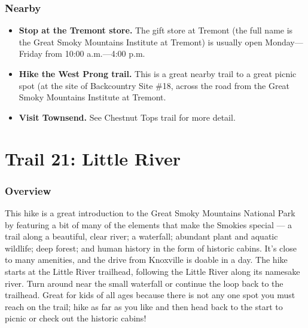 \documentclass[
  letterpaper,
  DIV=11,
  numbers=noendperiod]{scrreprt}
\providecommand{\tightlist}{%
  \setlength{\itemsep}{0pt}\setlength{\parskip}{0pt}}\usepackage{longtable,booktabs,array}
\begin{document}
\subsection{Nearby}\label{nearby-19}

\begin{itemize}
\tightlist
\item
  \textbf{Stop at the Tremont store.} The gift store at Tremont (the
  full name is the Great Smoky Mountains Institute at Tremont) is
  usually open Monday---Friday from 10:00 a.m.---4:00 p.m.
\item
  \textbf{Hike the West Prong trail.} This is a great nearby trail to a
  great picnic spot (at the site of Backcountry Site \#18, across the
  road from the Great Smoky Mountains Institute at Tremont.
\item
  \textbf{Visit Townsend.} See Chestnut Tops trail for more detail.
\end{itemize}

\chapter{Trail 21: Little River}\label{trail-21-little-river}

\subsection{Overview}\label{overview-21}

This hike is a great introduction to the Great Smoky Mountains National
Park by featuring a bit of many of the elements that make the Smokies
special --- a trail along a beautiful, clear river; a waterfall;
abundant plant and aquatic wildlife; deep forest; and human history in
the form of historic cabins. It's close to many amenities, and the drive
from Knoxville is doable in a day. The hike starts at the Little River
trailhead, following the Little River along its namesake river. Turn
around near the small waterfall or continue the loop back to the
trailhead. Great for kids of all ages because there is not any one spot
you must reach on the trail; hike as far as you like and then head back
to the start to picnic or check out the historic cabins!
\end{document}
